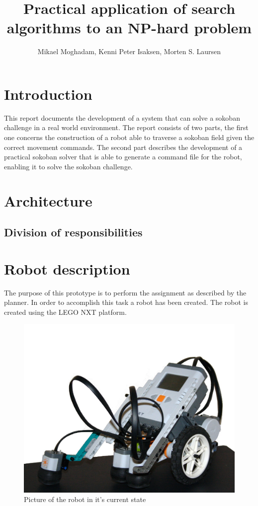 \documentclass[final, english, a4paper]{article}
\title{Practical application of search algorithms to an NP-hard problem}
\author{Mikael Moghadam, Kenni Peter Isaksen, Morten S. Laursen}
\begin{document}
\maketitle %


%
%
\newpage
\section{Introduction}
This report documents the development of a system that can solve a sokoban challenge in a real world environment. The report consists of two parts, the first one concerns the construction of a robot able to traverse a sokoban field given the correct movement commands. The second part describes the development of a practical sokoban solver that is able to generate a command file for the robot, enabling it to solve the sokoban challenge.
\newpage
\tableofcontents
\newpage
\section{Architecture}
	\subsection{Division of responsibilities}
	
\section{Robot description}
        The purpose of this prototype is to perform the assignment as described by
        the planner. In order to accomplish this task a robot 
        has been created. The robot is created using the LEGO NXT platform. 
        \begin{figure}[htp]
            \centering
    	    \includegraphics[scale=0.3]{robot2}
	        \caption{Picture of the robot in it's current state}\label{fig:robotPic}
        \end{figure} 
\end{document}
